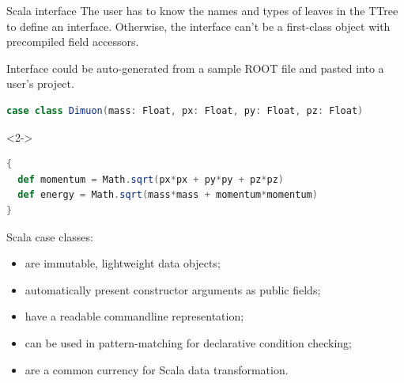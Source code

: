 \documentclass{beamer}
\begin{document}
\begin{frame}[fragile]{Scala interface}
The user has to know the names and types of leaves in the TTree to define an interface. Otherwise, the interface can't be a first-class object with precompiled field accessors.

\vspace{0.5\baselineskip}
Interface could be auto-generated from a sample ROOT file and pasted into a user's project.

\begin{lstlisting}[language=scala]
case class Dimuon(mass: Float, px: Float, py: Float, pz: Float)
\end{lstlisting}

\begin{uncoverenv}<2->
\vspace{-0.35 cm}
\begin{lstlisting}[language=scala]
{
  def momentum = Math.sqrt(px*px + py*py + pz*pz)
  def energy = Math.sqrt(mass*mass + momentum*momentum)
}
\end{lstlisting}
\end{uncoverenv}

Scala case classes:
\begin{itemize}
\item are immutable, lightweight data objects;
\item automatically present constructor arguments as public fields;
\item have a readable commandline representation;
\item can be used in pattern-matching for declarative condition checking;
\item are a common currency for Scala data transformation.
\end{itemize}
\end{frame}
\end{document}
